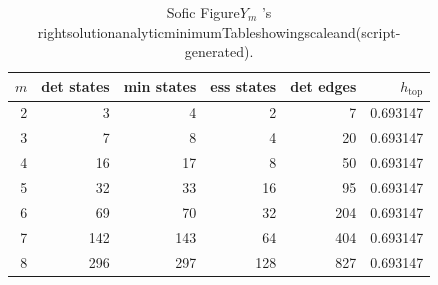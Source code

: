 \begin{table}[H]
\centering
\scriptsize
\setlength{\tabcolsep}{4pt}
\caption{Sofic Figure$Y_m$ 's rightsolutionanalyticminimumTableshowingscaleand(script-generated).}
\label{tab:phi_m_sofic_entropy}
\begin{tabular}{rrrrrr}
\toprule
$m$ & det states & min states & ess states & det edges & $h_{\mathrm{top}}$\\
\midrule
2 & 3 & 4 & 2 & 7 & 0.693147\\
3 & 7 & 8 & 4 & 20 & 0.693147\\
4 & 16 & 17 & 8 & 50 & 0.693147\\
5 & 32 & 33 & 16 & 95 & 0.693147\\
6 & 69 & 70 & 32 & 204 & 0.693147\\
7 & 142 & 143 & 64 & 404 & 0.693147\\
8 & 296 & 297 & 128 & 827 & 0.693147\\
\bottomrule
\end{tabular}
\end{table}
